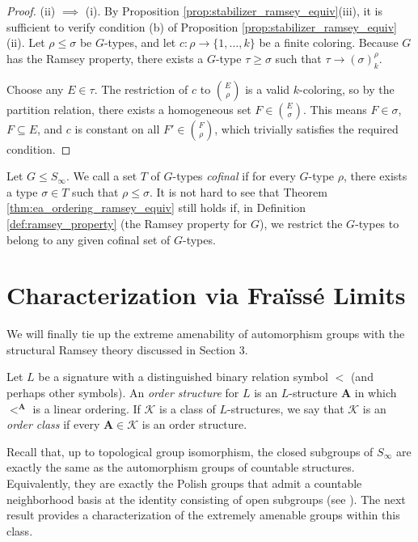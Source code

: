 \begin{proof}
    (ii) $\implies$ (i). By Proposition \ref{prop:stabilizer_ramsey_equiv}(iii), it is sufficient to verify condition (b) of Proposition \ref{prop:stabilizer_ramsey_equiv}(ii). Let $\rho \le \sigma$ be $G$-types, and let $c: \rho \to \{1, \dots, k\}$ be a finite coloring. Because $G$ has the Ramsey property, there exists a $G$-type $\tau \ge \sigma$ such that $\tau \to (\sigma)^\rho_k$.

    Choose any $E \in \tau$. The restriction of $c$ to $\binom{E}{\rho}$ is a valid $k$-coloring, so by the partition relation, there exists a homogeneous set $F \in \binom{E}{\sigma}$. This means $F \in \sigma$, $F \subseteq E$, and $c$ is constant on all $F' \in \binom{F}{\rho}$, which trivially satisfies the required condition.
\end{proof}


\begin{remark}
    \label{rem:cofinal_ramsey}
    Let $G \le S_\infty$. We call a set $T$ of $G$-types \textit{cofinal} if for every $G$-type $\rho$, there exists a type $\sigma \in T$ such that $\rho \le \sigma$. It is not hard to see that Theorem \ref{thm:ea_ordering_ramsey_equiv} still holds if, in Definition \ref{def:ramsey_property} (the Ramsey property for $G$), we restrict the $G$-types to belong to any given cofinal set of $G$-types.
\end{remark}

\section{Characterization via Fraïssé Limits}
\label{sec:fraisse_characterization}



We will finally tie up the extreme amenability of automorphism groups with the structural Ramsey theory discussed in Section 3.

Let $L$ be a signature with a distinguished binary relation symbol $<$ (and perhaps other symbols). An \textit{order structure} for $L$ is an $L$-structure $\mathbf{A}$ in which $<^\mathbf{A}$ is a linear ordering. If $\mathcal{K}$ is a class of $L$-structures, we say that $\mathcal{K}$ is an \textit{order class} if every $\mathbf{A} \in \mathcal{K}$ is an order structure.

Recall that, up to topological group isomorphism, the closed subgroups of $S_\infty$ are exactly the same as the automorphism groups of countable structures. Equivalently, they are exactly the Polish groups that admit a countable neighborhood basis at the identity consisting of open subgroups (see \cite[Section 1.5]{BK}). The next result provides a characterization of the extremely amenable groups within this class.



